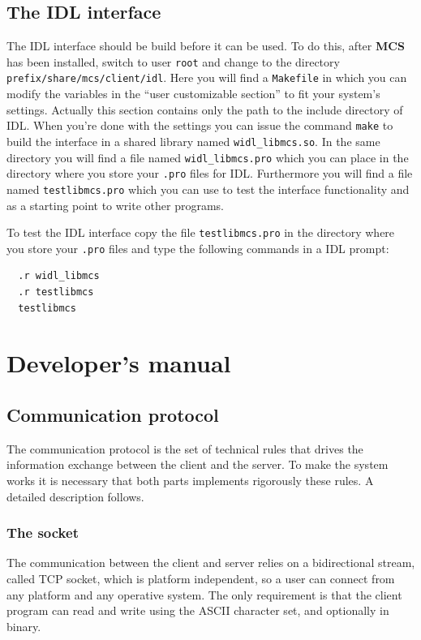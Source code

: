 \documentclass[12pt,titlepage]{book}
\newcommand{\mcs}{\textbf{MCS} }
\begin{document}
\section{The IDL interface}
\label{sec-The IDL interface}
The IDL interface should be build before it can be used. To do this, after
\mcs has been installed, switch to user \verb|root| and change to the
directory \verb|prefix/share/mcs/client/idl|. Here you will find a
\verb|Makefile| in which you can modify the variables in the ``user
customizable section'' to fit your system's settings. Actually this section
contains only the path to the include directory of IDL. When you're done with
the settings you can issue the command \verb|make| to build the interface in a
shared library named \verb|widl_libmcs.so|. In the same directory you will
find a file named \verb|widl_libmcs.pro| which you can place in the directory
where you store your \verb|.pro| files for IDL. Furthermore you will find a
file named \verb|testlibmcs.pro| which you can use to test the interface
functionality and as a starting point to write other programs.

\noindent To test the IDL interface copy the file \verb|testlibmcs.pro| in the
directory where you store your \verb|.pro| files and type the following
commands in a IDL prompt:
\begin{verbatim}
  .r widl_libmcs
  .r testlibmcs
  testlibmcs
\end{verbatim}


\chapter{Developer's manual}
\label{chap:developer}

\section{Communication protocol}
The communication protocol is the set of technical rules that drives
the information exchange between the client and the server. To make
the system works it is necessary that both parts implements rigorously
these rules. A detailed description follows.

\subsection{The socket}
The communication between the client and server relies on a
bidirectional stream, called TCP socket, which is platform
independent, so a user can connect from any platform and any operative
system. The only requirement is that the client program can read and
write using the ASCII character set, and optionally in binary.
\end{document}
